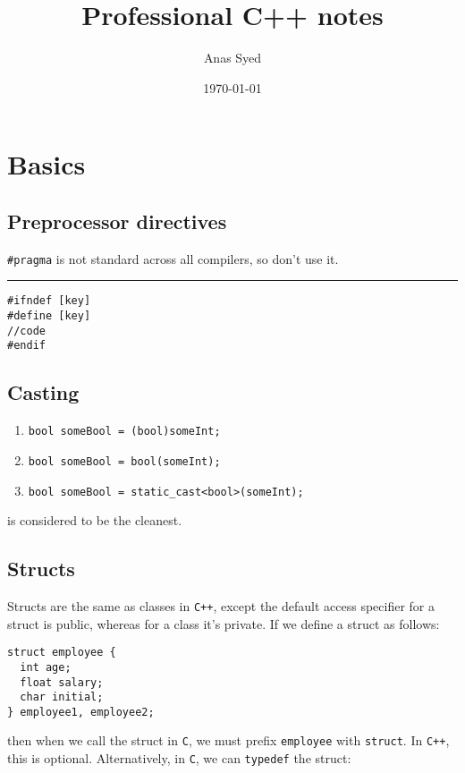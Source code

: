 \documentclass[a4paper,12pt,oneside]{book}
\title{Professional C++ notes}
\date{\today}
\author{Anas Syed}
\newcommand*{\hlinebreak}{\rule{\textwidth}{1pt}}
\begin{document}
\hypersetup{pageanchor=false}
\maketitle
\tableofcontents
\newcommand{\chapterbreak}{\clearpage}

\chapter{Basics}
\hypersetup{pageanchor=true}
\section{Preprocessor directives}

\lstinline|#pragma| is not standard across all compilers, so don't use it.

\hlinebreak
\begin{lstlisting}[caption={Prevent circular includes}]
#ifndef [key]
#define [key]
//code
#endif
\end{lstlisting}

\section{Casting}
\begin{enumerate}
  \item \lstinline|bool someBool = (bool)someInt;|
  \item \lstinline|bool someBool = bool(someInt);|
  \item \label{itm:static_cast} \lstinline|bool someBool = static_cast<bool>(someInt);|
\end{enumerate}
 is considered to be the cleanest.

\section{Structs}
Structs are the same as classes in \verb|C++|, except the default access specifier for a struct is public, whereas for a class it's private. If we define a struct as follows:

\begin{lstlisting}
struct employee {
  int age;
  float salary;
  char initial;
} employee1, employee2;
\end{lstlisting}

then when we call the struct in \verb|C|, we must prefix \verb|employee| with \verb|struct|. In \verb|C++|, this is optional. Alternatively, in \verb|C|, we can \verb|typedef| the struct:
\end{document}
